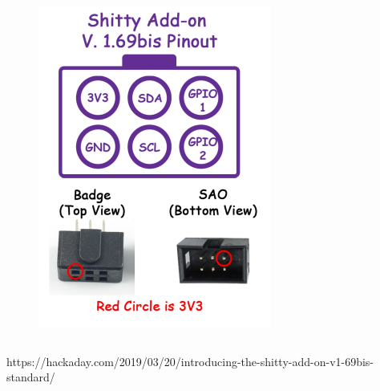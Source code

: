 \documentclass[t]{beamer}
\begin{document}
\begin{frame}
\begin{columns}[c]
	\begin{figure}
		\includegraphics[width=0.9\linewidth]{sao69.png}
	\end{figure}
	
\end{columns}

https://hackaday.com/2019/03/20/introducing-the-shitty-add-on-v1-69bis-standard/
\end{frame}

\end{document}
